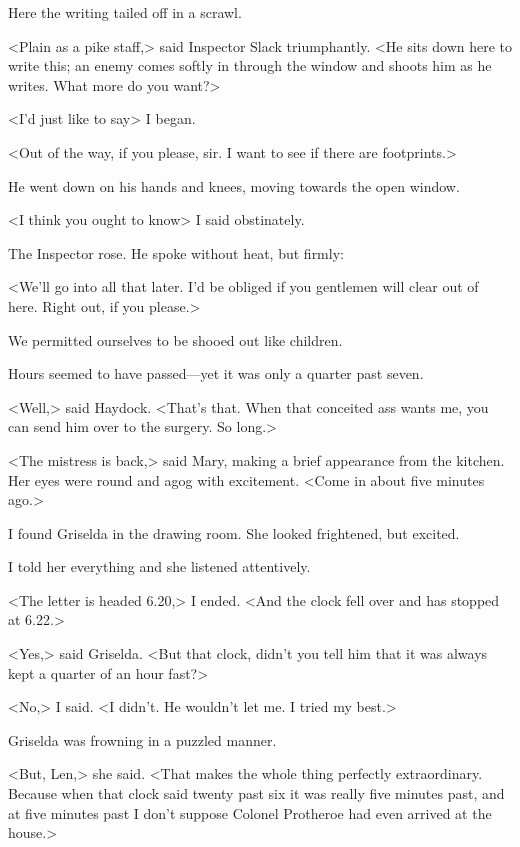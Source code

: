Here the writing tailed off in a scrawl.

<Plain as a pike staff,> said Inspector Slack triumphantly. <He sits down here to write this; an enemy comes softly in through the window and shoots him as he writes. What more do you want?>

<I'd just like to say\longdash> I began.

<Out of the way, if you please, sir. I want to see if there are footprints.>

He went down on his hands and knees, moving towards the open window.

<I think you ought to know\longdash> I said obstinately.

The Inspector rose. He spoke without heat, but firmly:

<We'll go into all that later. I'd be obliged if you gentlemen will clear out of here. Right out, if you please.>

We permitted ourselves to be shooed out like children.

Hours seemed to have passed—yet it was only a quarter past seven.

<Well,> said Haydock. <That's that. When that conceited ass wants me, you can send him over to the surgery. So long.>

<The mistress is back,> said Mary, making a brief appearance from the kitchen. Her eyes were round and agog with excitement. <Come in about five minutes ago.>

I found Griselda in the drawing room. She looked frightened, but excited.

I told her everything and she listened attentively.

<The letter is headed 6.20,> I ended. <And the clock fell over and has stopped at 6.22.>

<Yes,> said Griselda. <But that clock, didn't you tell him that it was always kept a quarter of an hour fast?>

<No,> I said. <I didn't. He wouldn't let me. I tried my best.>

Griselda was frowning in a puzzled manner.

<But, Len,> she said. <That makes the whole thing perfectly extraordinary. Because when that clock said twenty past six it was really five minutes past, and at five minutes past I don't suppose Colonel Protheroe had even arrived at the house.>